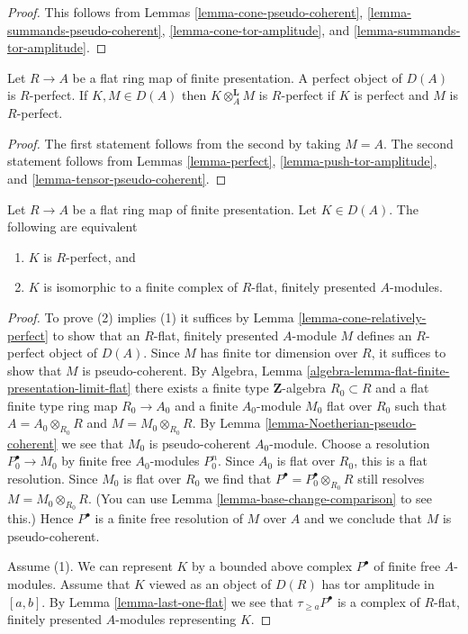 \begin{proof}
This follows from
Lemmas \ref{lemma-cone-pseudo-coherent},
\ref{lemma-summands-pseudo-coherent},
\ref{lemma-cone-tor-amplitude}, and
\ref{lemma-summands-tor-amplitude}.
\end{proof}

\begin{lemma}
\label{lemma-perfect-relatively-perfect}
Let $R \to A$ be a flat ring map of finite presentation.
A perfect object of $D(A)$ is $R$-perfect. If $K, M \in D(A)$
then $K \otimes_A^\mathbf{L} M$ is $R$-perfect if $K$ is perfect
and $M$ is $R$-perfect.
\end{lemma}

\begin{proof}
The first statement follows from the second by taking $M = A$.
The second statement follows from Lemmas \ref{lemma-perfect},
\ref{lemma-push-tor-amplitude}, and \ref{lemma-tensor-pseudo-coherent}.
\end{proof}

\begin{lemma}
\label{lemma-structure-relatively-perfect}
Let $R \to A$ be a flat ring map of finite presentation.
Let $K \in D(A)$. The following are equivalent
\begin{enumerate}
\item $K$ is $R$-perfect, and
\item $K$ is isomorphic to a finite complex of $R$-flat,
finitely presented $A$-modules.
\end{enumerate}
\end{lemma}

\begin{proof}
To prove (2) implies (1) it suffices by
Lemma \ref{lemma-cone-relatively-perfect}
to show that an $R$-flat, finitely presented $A$-module $M$ defines
an $R$-perfect object of $D(A)$. Since $M$ has finite tor dimension
over $R$, it suffices to show that $M$ is pseudo-coherent. By
Algebra, Lemma \ref{algebra-lemma-flat-finite-presentation-limit-flat}
there exists a finite type $\mathbf{Z}$-algebra $R_0 \subset R$
and a flat finite type ring map $R_0 \to A_0$ and
a finite $A_0$-module $M_0$ flat over $R_0$ such that
$A = A_0 \otimes_{R_0} R$ and $M = M_0 \otimes_{R_0} R$. By
Lemma \ref{lemma-Noetherian-pseudo-coherent}
we see that $M_0$ is pseudo-coherent $A_0$-module.
Choose a resolution $P_0^\bullet \to M_0$ by finite free
$A_0$-modules $P_0^n$. Since $A_0$ is flat over $R_0$,
this is a flat resolution. Since $M_0$ is flat over $R_0$
we find that $P^\bullet = P_0^\bullet \otimes_{R_0} R$
still resolves $M = M_0 \otimes_{R_0} R$. (You can use
Lemma \ref{lemma-base-change-comparison} to see this.)
Hence $P^\bullet$ is a finite free resolution of $M$
over $A$ and we conclude that $M$ is pseudo-coherent.

\medskip\noindent
Assume (1). We can represent $K$ by a bounded above complex
$P^\bullet$ of finite free $A$-modules. Assume that
$K$ viewed as an object of $D(R)$ has tor amplitude in $[a, b]$.
By Lemma \ref{lemma-last-one-flat} we see that
$\tau_{\geq a}P^\bullet$ is a complex of $R$-flat, finitely
presented $A$-modules representing $K$.
\end{proof}

